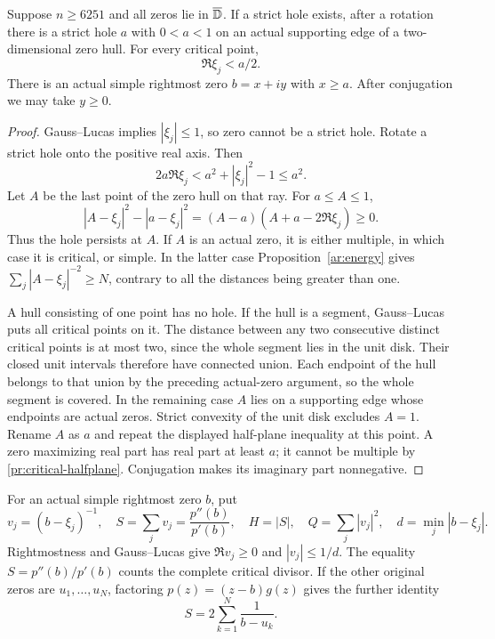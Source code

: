 \begin{lemma}\label{pr:edge-reduction}
Suppose $n\ge6251$ and all zeros lie in $\overline{\mathbb D}$. If a strict
hole exists, after a rotation there is a strict hole $a$ with
$0<a<1$ on an actual supporting edge of a two-dimensional zero hull.
For every critical point,
\begin{equation}\label{pr:critical-halfplane}
 \Re\xi_j<a/2.
\end{equation}
There is an actual simple rightmost zero $b=x+iy$ with $x\ge a$.
After conjugation we may take $y\ge0$.
\end{lemma}
\begin{proof}
Gauss--Lucas implies $|\xi_j|\le1$, so zero cannot be a strict
hole. Rotate a strict hole onto the positive real axis. Then
\[
 2a\Re\xi_j<a^2+|\xi_j|^2-1\le a^2.
\]
Let $A$ be the last point of the zero hull on that ray. For
$a\le A\le1$,
\[
 |A-\xi_j|^2-|a-\xi_j|^2
 =(A-a)(A+a-2\Re\xi_j)\ge0.
\]
Thus the hole persists at $A$. If $A$ is an actual zero, it is either
multiple, in which case it is critical, or simple. In the latter
case Proposition~\ref{ar:energy} gives
$\sum_j|A-\xi_j|^{-2}\ge N$, contrary to all the distances being
greater than one.

A hull consisting of one point has no hole. If the hull is a segment,
Gauss--Lucas puts all critical points on it. The distance between any
two consecutive distinct critical points is at most two, since the
whole segment lies in the unit disk. Their closed unit intervals
therefore have connected union. Each endpoint of the hull belongs
to that union by the preceding actual-zero argument, so the whole
segment is covered. In the remaining case $A$ lies on a supporting
edge whose endpoints are actual zeros. Strict convexity of the unit
disk excludes $A=1$. Rename $A$ as $a$ and repeat the displayed
half-plane inequality at this point. A zero maximizing real part
has real part at least $a$; it cannot be multiple by
\eqref{pr:critical-halfplane}. Conjugation makes its imaginary part
nonnegative.
\end{proof}

For an actual simple rightmost zero $b$, put
\begin{equation}\label{pr:field-notation}
 v_j=(b-\xi_j)^{-1},\quad S=\sum_jv_j=\frac{p''(b)}{p'(b)},
 \quad H=|S|,\quad Q=\sum_j|v_j|^2,\quad
 d=\min_j|b-\xi_j|.
\end{equation}
Rightmostness and Gauss--Lucas give $\Re v_j\ge0$ and
$|v_j|\le1/d$. The equality $S=p''(b)/p'(b)$ counts the complete
critical divisor. If the other original zeros are $u_1,\ldots,u_N$,
factoring $p(z)=(z-b)g(z)$ gives the further identity
\begin{equation}\label{pr:actual-root-identity}
 S=2\sum_{k=1}^N\frac1{b-u_k}.
\end{equation}

